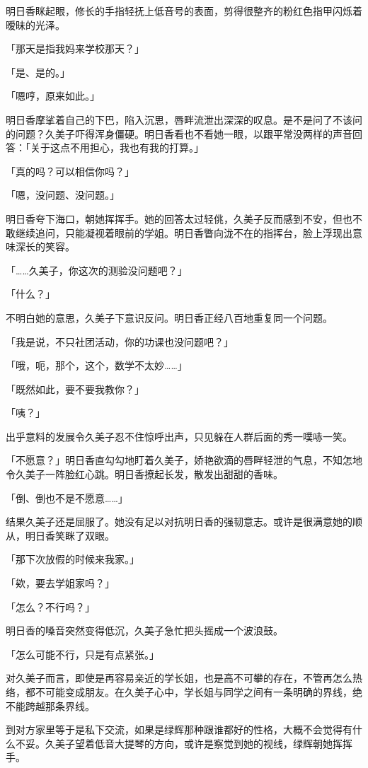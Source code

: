\documentclass[UTF8]{ctexart}
\begin{document}
    明日香眯起眼，修长的手指轻抚上低音号的表面，剪得很整齐的粉红色指甲闪烁着暧昧的光泽。 

    「那天是指我妈来学校那天？」 

    「是、是的。」 

    「嗯哼，原来如此。」 

    明日香摩挲着自己的下巴，陷入沉思，唇畔流泄出深深的叹息。是不是问了不该问的问题？久美子吓得浑身僵硬。明日香看也不看她一眼，以跟平常没两样的声音回答：「关于这点不用担心，我也有我的打算。」 

    「真的吗？可以相信你吗？」 

    「嗯，没问题、没问题。」 

    明日香夸下海口，朝她挥挥手。她的回答太过轻佻，久美子反而感到不安，但也不敢继续追问，只能凝视着眼前的学姐。明日香瞥向泷不在的指挥台，脸上浮现出意味深长的笑容。 

    「……久美子，你这次的测验没问题吧？」 

    「什么？」 

    不明白她的意思，久美子下意识反问。明日香正经八百地重复同一个问题。 

    「我是说，不只社团活动，你的功课也没问题吧？」 

    「哦，呃，那个，这个，数学不太妙……」 

    「既然如此，要不要我教你？」 

    「咦？」 

    出乎意料的发展令久美子忍不住惊呼出声，只见躲在人群后面的秀一噗哧一笑。 

    「不愿意？」明日香直勾勾地盯着久美子，娇艳欲滴的唇畔轻泄的气息，不知怎地令久美子一阵脸红心跳。明日香撩起长发，散发出甜甜的香味。 

    「倒、倒也不是不愿意……」 

    结果久美子还是屈服了。她没有足以对抗明日香的强韧意志。或许是很满意她的顺从，明日香笑眯了双眼。 

    「那下次放假的时候来我家。」 

    「欸，要去学姐家吗？」 

    「怎么？不行吗？」 

    明日香的嗓音突然变得低沉，久美子急忙把头摇成一个波浪鼓。 

    「怎么可能不行，只是有点紧张。」 

    对久美子而言，即使是再容易亲近的学长姐，也是高不可攀的存在，不管再怎么热络，都不可能变成朋友。在久美子心中，学长姐与同学之间有一条明确的界线，绝不能跨越那条界线。 

    到对方家里等于是私下交流，如果是绿辉那种跟谁都好的性格，大概不会觉得有什么不妥。久美子望着低音大提琴的方向，或许是察觉到她的视线，绿辉朝她挥挥手。 
\end{document}
